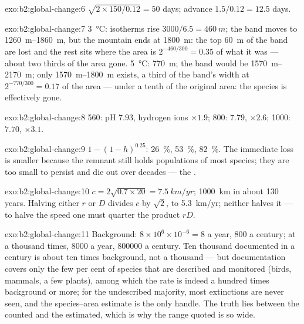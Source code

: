 \begin{solution}{exo:b2:global-change:6}
$\sqrt{2\times 150/0.12} = 50$ days; advance $1.5/0.12 = 12.5$
days.
\end{solution}

\begin{solution}{exo:b2:global-change:7}
\qty{3}{\celsius}: isotherms rise $3000/6.5 = \qty{460}{m}$; the
band moves to \qtyrange{1260}{1860}{m}, but the mountain ends at
\qty{1800}{m}: the top \qty{60}{m} of the band are lost and the rest
sits where the area is $2^{-460/300} = 0.35$ of what it was --- about
two thirds of the area gone. \qty{5}{\celsius}: \qty{770}{m}; the
band would be \qtyrange{1570}{2170}{m}; only \qtyrange{1570}{1800}{m}
exists, a third of the band's width at $2^{-770/300} = 0.17$ of the
area --- under a tenth of the original area: the species is
effectively gone.
\end{solution}

\begin{solution}{exo:b2:global-change:8}
560: pH $7.93$, hydrogen ions $\times 1.9$; 800: $7.79$, $\times
2.6$; 1000: $7.70$, $\times 3.1$.
\end{solution}

\begin{solution}{exo:b2:global-change:9}
$1 - (1 - h)^{0.25}$: \qty{26}{\%}, \qty{53}{\%}, \qty{82}{\%}. The
immediate loss is smaller because the remnant still holds
populations of most species; they are too small to persist and
die out over decades --- the .
\end{solution}

\begin{solution}{exo:b2:global-change:10}
$c = 2\sqrt{0.7\times 20} = \qty{7.5}{km/yr}$; \qty{1000}{km} in
about 130 years. Halving either $r$ or $D$ divides $c$ by
$\sqrt 2$, to \qty{5.3}{km/yr}; neither halves it --- to halve the
speed one must quarter the product $rD$.
\end{solution}

\begin{solution}{exo:b2:global-change:11}
Background: $8\times 10^{6}\times 10^{-6} = 8$ a year, 800 a
century; at a thousand times, 8000 a year, \num{800000} a century.
Ten thousand documented in a century is about ten times
background, not a thousand --- but documentation covers only the
few per cent of species that are described and monitored (birds,
mammals, a few plants), among which the rate is indeed a hundred
times background or more; for the undescribed majority, most
extinctions are never seen, and the species--area estimate is the
only handle. The truth lies between the counted and the
estimated, which is why the range quoted is so wide.
\end{solution}

